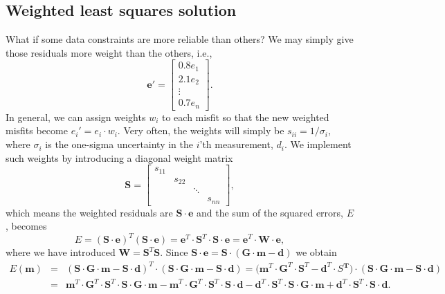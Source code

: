 \subsection{Weighted least squares solution}

	What if some data constraints are more reliable than others? We may simply give those residuals more 
weight than the others, i.e.,
\begin{equation}
\mathbf{e}' = \left[ \begin{array}{c} 0.8 e_1 \\ 2.1e_2\\ \vdots \\ 0.7 e_n \end{array} \right ] .
\end{equation}	 
In general, we can assign weights $w_i$ to each misfit so that the new weighted misfits become $e_i' = e_i\cdot w_i$.
Very often, the weights will simply be $s_{ii} = 1/\sigma_i$, where $\sigma_i$ is the one-sigma uncertainty in the $i$'th measurement, $d_i$.
We implement such weights by introducing a diagonal weight matrix
\begin{equation}
{\mathbf S} = \left[\begin{array}{cccc}
s_{11} \\ & s_{22}\\ & & \ddots\\ & & & s_{nn} \end{array}
  \right ],
\end{equation}
which means the weighted residuals are $\mathbf{S}\cdot\mathbf{e}$ and the sum of the squared errors, $E$, becomes
\begin{equation}
E = \left (\mathbf{S}\cdot\mathbf{e}\right )^T\left (\mathbf{S}\cdot\mathbf{e}\right ) = \mathbf{e}^T \cdot \mathbf{S}^T \cdot \mathbf{S \cdot e = e}^T \cdot \mathbf{W \cdot e},
\end{equation}	 
where we have introduced $\mathbf{W = S}^T\mathbf{S}$. Since $\mathbf{S} \cdot \mathbf{e = S\cdot(G \cdot m - d)}$ we obtain
\begin{equation}
\begin{array}{rcl}
E(\mathbf{m}) & = & \mathbf{(S \cdot G \cdot m - S\cdot d)}^T \cdot \mathbf{(S \cdot G \cdot m - S \cdot d)} =
(\mathbf{m}^T \cdot \mathbf{G}^T \cdot \mathbf{S}^T - \mathbf{d}^T \cdot S\mathbf{^T) \cdot (S \cdot G \cdot m - S \cdot d)}\\
& = & \mathbf{m}^T \cdot \mathbf{G} ^T \cdot \mathbf{S}^T \cdot \mathbf{S \cdot G \cdot  m - m}^T \cdot \mathbf{G}^T \cdot \mathbf{S}^T \cdot \mathbf{S \cdot d - d}^T \cdot \mathbf{S}^T \cdot \mathbf{S \cdot G  \cdot m + d}^T \cdot \mathbf{S}^T \cdot \mathbf{S \cdot d}.
\end{array}
\end{equation}
